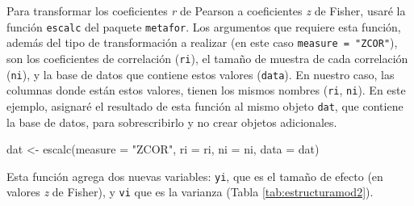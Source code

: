 \documentclass[
  bookmarksnumbered]{article}
\newenvironment{Shaded}{\begin{snugshade}}{\end{snugshade}}
\newcommand{\AttributeTok}[1]{\textcolor[rgb]{0.00,0.34,0.68}{#1}}
\newcommand{\FunctionTok}[1]{\textcolor[rgb]{0.39,0.29,0.61}{#1}}
\newcommand{\NormalTok}[1]{\textcolor[rgb]{0.12,0.11,0.11}{#1}}
\newcommand{\OtherTok}[1]{\textcolor[rgb]{0.00,0.43,0.16}{#1}}
\newcommand{\StringTok}[1]{\textcolor[rgb]{0.75,0.01,0.01}{#1}}
\begin{document}
Para transformar los coeficientes \emph{r} de Pearson a coeficientes \emph{z} de Fisher, usaré la función \texttt{escalc} del paquete \texttt{metafor}. Los argumentos que requiere esta función, además del tipo de transformación a realizar (en este caso \texttt{measure\ =\ "ZCOR"}), son los coeficientes de correlación (\texttt{ri}), el tamaño de muestra de cada correlación (\texttt{ni}), y la base de datos que contiene estos valores (\texttt{data}). En nuestro caso, las columnas donde están estos valores, tienen los mismos nombres (\texttt{ri}, \texttt{ni}). En este ejemplo, asignaré el resultado de esta función al mismo objeto \texttt{dat}, que contiene la base de datos, para sobrescribirlo y no crear objetos adicionales.

\begin{Shaded}
\begin{Highlighting}[]
\NormalTok{dat }\OtherTok{\textless{}{-}} \FunctionTok{escalc}\NormalTok{(}\AttributeTok{measure =} \StringTok{"ZCOR"}\NormalTok{, }\AttributeTok{ri =}\NormalTok{ ri, }\AttributeTok{ni =}\NormalTok{ ni, }\AttributeTok{data =}\NormalTok{ dat)}
\end{Highlighting}
\end{Shaded}

Esta función agrega dos nuevas variables: \texttt{yi}, que es el tamaño de efecto (en valores \emph{z} de Fisher), y \texttt{vi} que es la varianza (Tabla \ref{tab:estructuramod2}).
\end{document}
